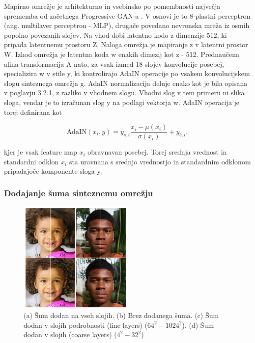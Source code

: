 \documentclass[a4paper,12pt,openright]{book}
\begin{document}
Mapirno omrežje je arhitekturno in vsebinsko po pomembnosti največja sprememba od začetnega Progressive GAN-a \cite{karras2017progressive}. V osnovi je to 8-plastni perceptron (ang. multilayer perceptron - MLP), drugače povedano nevronska mreža iz osmih popolno povezanih slojev. Na vhod dobi latentno kodo z dimenzije 512, ki pripada latentnemu prostoru Z. Naloga omrežja je mapiranje z v latentni prostor W. Izhod omrežja je latentna koda w enakih dimezij kot z - 512. Prednaučena afina transformacija A nato, za vsak izmed 18 slojev konvolucije posebej, specializira w v stile y, ki kontrolirajo AdaIN operacije po vsakem konvolucijskem slogu sinteznega omrežja g. AdaIN normalizacija deluje enako kot je bila opisana v poglavju 3.2.1, z razliko v vhodnem slogu. Vhodni slog v tem primeru ni slika sloga, vendar je to izračunan slog y na podlagi vektorja w. AdaIN operacija je torej definirana kot

\begin{equation}
\text{AdaIN}(x_{i},y) = y_{s,i} \frac{x_{i} - \mu(x_{i})}{\sigma(x_{i})} + y_{b,i},
\end{equation}

kjer je vsak feature map $x_{i}$ obravnavan posebej. Torej srednja vrednost in standardni odklon $x_{i}$ sta uravnana s srednjo vrednostjo in standardnim odklonom pripadajoče komponente sloga y.


\subsubsection{Dodajanje šuma sinteznemu omrežju}

\begin{figure}[htb]
\begin{center}
  \includegraphics[width=0.5\textwidth]{images/stylegan_noise.png}
\end{center}
  \caption{(a) Šum dodan na vseh slojih. (b) Brez dodanega šuma. (c) Šum dodan v slojih podrobnosti (fine layers) ($64^2 - 1024^2$). (d) Šum dodan v slojih (coarse layers)  ($4^2 - 32^2$)}
  \label{AdaIN}
\end{figure}
\end{document}
